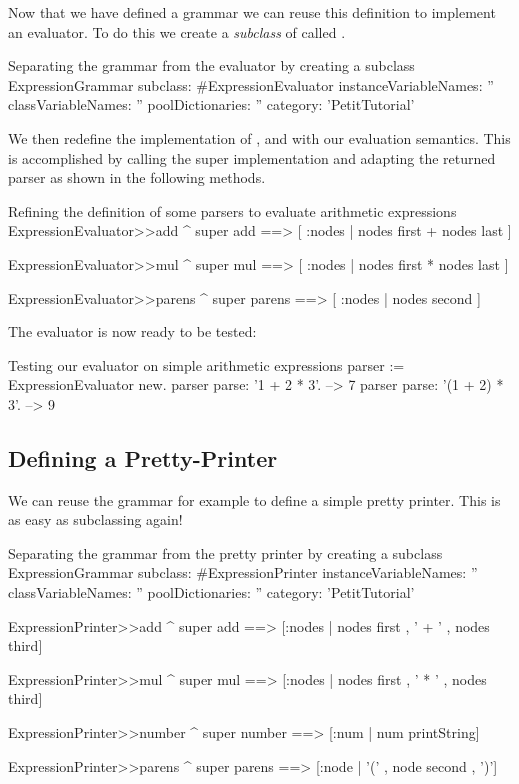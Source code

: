 \documentclass[a4paper,10pt,twoside]{book}
\begin{document}
Now that we have defined a grammar we can reuse this definition to
implement an evaluator. To do this we create a \emph{subclass} of
 called .

\begin{script}{Separating the grammar from the evaluator by creating a subclass}
ExpressionGrammar subclass: #ExpressionEvaluator
   instanceVariableNames: ''
   classVariableNames: ''
   poolDictionaries: ''
   category: 'PetitTutorial'
\end{script}

We then redefine the implementation of ,  and
 with our evaluation semantics. This is accomplished by
calling the super implementation and adapting the returned parser as shown in the following methods.

\begin{script}{Refining the definition of some parsers to evaluate arithmetic expressions}
ExpressionEvaluator>>add
   ^ super add ==> [ :nodes | nodes first + nodes last ]

ExpressionEvaluator>>mul
   ^ super mul ==> [ :nodes | nodes first * nodes last ]

ExpressionEvaluator>>parens
   ^ super parens ==> [ :nodes | nodes second ]
\end{script}

The evaluator is now ready to be tested:

\begin{script}{Testing our evaluator on simple arithmetic expressions}
parser := ExpressionEvaluator new.
parser parse: '1 + 2 * 3'.       --> 7
parser parse: '(1 + 2) * 3'.     --> 9
\end{script}

\subsection{Defining a Pretty-Printer}

We can reuse the grammar for example to define a simple pretty printer.
This is as easy as subclassing  again!

\begin{script}{Separating the grammar from the pretty printer by creating a subclass}
ExpressionGrammar subclass: #ExpressionPrinter
  instanceVariableNames: ''
  classVariableNames: ''
  poolDictionaries: ''
  category: 'PetitTutorial'

ExpressionPrinter>>add
  ^ super add ==> [:nodes | nodes first , ' + ' , nodes third]

ExpressionPrinter>>mul
  ^ super mul ==> [:nodes | nodes first , ' * ' , nodes third]

ExpressionPrinter>>number
  ^ super number ==> [:num | num printString]

ExpressionPrinter>>parens
  ^ super parens ==> [:node | '(' , node second , ')']
\end{script}
\end{document}
